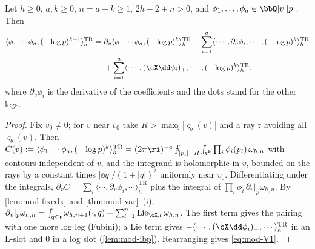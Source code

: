\begin{prop}
\label{prop:mod-V1}
Let $h\geq 0$, $a,k\geq 0$, $n=a+k\geq 1$, $2h-2+n>0$, and $\phi_1,\dots,\phi_a\in\bbQ[v][p]$. Then
\begin{equation}
\label{eq:mod-V1}
\begin{aligned}
\langle\phi_1\cdots\phi_a,(-\log p)^{k+1}\rangle^{\mathrm{TR}}_h={}&\partial_v\langle\phi_1\cdots\phi_a,(-\log p)^k\rangle^{\mathrm{TR}}_h-\sum_{i=1}^a\langle\cdots,\partial_v\phi_i,\cdots,(-\log p)^k\rangle^{\mathrm{TR}}_h\\
&+\sum_{i=1}^a\langle\cdots,(\cX\dd\phi_i)_+,\cdots,(-\log p)^k\rangle^{\mathrm{TR}}_h ,
\end{aligned}
\end{equation}
where $\partial_v\phi_i$ is the derivative of the coefficients and the dots stand for the other legs.
\end{prop}

\begin{proof}
Fix $v_0\neq 0$; for $v$ near $v_0$ take $R>\max_b|\varsigma_b(v)|$ and a ray $\mathfrak r$ avoiding all $\varsigma_b(v)$. Then $C(v):=\langle\phi_1\cdots\phi_a,(-\log p)^k\rangle^{\mathrm{TR}}_h=(2\pi\ri)^{-a}\oint_{|p_i|=R}\int_{\mathfrak r^k}\prod_i\phi_i(p_i)\,\omega_{h,n}$ with contours independent of $v$, and the integrand is holomorphic in $v$, bounded on the rays by a constant times $|\dd q|/(1+|q|)^2$ uniformly near $v_0$. Differentiating under the integrals, $\partial_vC=\sum_i\langle\cdots,\partial_v\phi_i,\cdots\rangle^{\mathrm{TR}}_h$ plus the integral of $\prod_i\phi_i\,\partial_v|_p\omega_{h,n}$. By \cref{lem:mod-fixedx} and \cref{thm:mod-var}~(i), $\partial_v|_p\omega_{h,n}=\int_{q\in\mathfrak r}\omega_{h,n+1}(\cdot,q)+\sum_{l=1}^n\mathrm{Lie}_{\cX,l}\,\omega_{h,n}$. The first term gives the pairing with one more log leg (Fubini); a Lie term gives $-\langle\cdots,(\cX\dd\phi_i)_+,\cdots\rangle^{\mathrm{TR}}_h$ in an L-slot and $0$ in a log slot (\cref{lem:mod-ibp}). Rearranging gives \eqref{eq:mod-V1}.
\end{proof}


